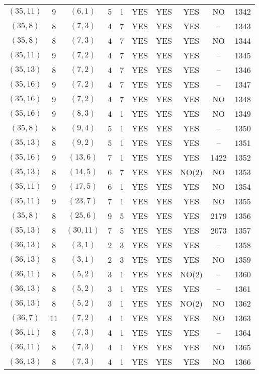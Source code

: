 \begin{longtable}{|c|c|c|c|c|c|c|c|c|c|}
$(35, 11)$ & 9 & $(6, 1)$ & 5 & 1 & YES & YES & YES & NO & 1342\\
$(35, 8)$ & 8 & $(7, 3)$ & 4 & 7 & YES & YES & YES & -- & 1343\\
$(35, 8)$ & 8 & $(7, 3)$ & 4 & 7 & YES & YES & YES & NO & 1344\\
$(35, 11)$ & 9 & $(7, 2)$ & 4 & 7 & YES & YES & YES & -- & 1345\\
$(35, 13)$ & 8 & $(7, 2)$ & 4 & 7 & YES & YES & YES & -- & 1346\\
$(35, 16)$ & 9 & $(7, 2)$ & 4 & 7 & YES & YES & YES & -- & 1347\\
$(35, 16)$ & 9 & $(7, 2)$ & 4 & 7 & YES & YES & YES & NO & 1348\\
$(35, 16)$ & 9 & $(8, 3)$ & 4 & 1 & YES & YES & YES & NO & 1349\\
$(35, 8)$ & 8 & $(9, 4)$ & 5 & 1 & YES & YES & YES & -- & 1350\\
$(35, 13)$ & 8 & $(9, 2)$ & 5 & 1 & YES & YES & YES & -- & 1351\\
$(35, 16)$ & 9 & $(13, 6)$ & 7 & 1 & YES & YES & YES & 1422 & 1352\\
$(35, 13)$ & 8 & $(14, 5)$ & 6 & 7 & YES & YES & NO(2) & NO & 1353\\
$(35, 11)$ & 9 & $(17, 5)$ & 6 & 1 & YES & YES & YES & NO & 1354\\
$(35, 11)$ & 9 & $(23, 7)$ & 7 & 1 & YES & YES & YES & NO & 1355\\
$(35, 8)$ & 8 & $(25, 6)$ & 9 & 5 & YES & YES & YES & 2179 & 1356\\
$(35, 13)$ & 8 & $(30, 11)$ & 7 & 5 & YES & YES & YES & 2073 & 1357\\
$(36, 13)$ & 8 & $(3, 1)$ & 2 & 3 & YES & YES & YES & -- & 1358\\
$(36, 13)$ & 8 & $(3, 1)$ & 2 & 3 & YES & YES & YES & NO & 1359\\
$(36, 11)$ & 8 & $(5, 2)$ & 3 & 1 & YES & YES & NO(2) & -- & 1360\\
$(36, 13)$ & 8 & $(5, 2)$ & 3 & 1 & YES & YES & YES & -- & 1361\\
$(36, 13)$ & 8 & $(5, 2)$ & 3 & 1 & YES & YES & NO(2) & NO & 1362\\
$(36, 7)$ & 11 & $(7, 2)$ & 4 & 1 & YES & YES & YES & NO & 1363\\
$(36, 11)$ & 8 & $(7, 3)$ & 4 & 1 & YES & YES & YES & -- & 1364\\
$(36, 11)$ & 8 & $(7, 3)$ & 4 & 1 & YES & YES & YES & NO & 1365\\
$(36, 13)$ & 8 & $(7, 3)$ & 4 & 1 & YES & YES & YES & NO & 1366\\

\end{longtable}
